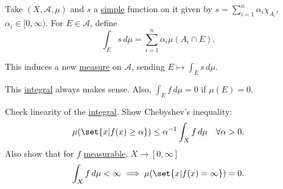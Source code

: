 \documentclass{article}
\begin{document}
\begin{defi}
    Take  $(X, \mathscr{A}, \mu)$ and $s$ a \hyperlink{def:simple}{simple} function on it given by $s=\sum_{i=1}^n \alpha_i \chi_{A_i}$, $\alpha_i \in [0, \infty)$.
    For $E \in \mathscr{A}$, define
    \begin{equation*}
        \int_E s \, d\mu = \sum_{i=1}^n \alpha_i \mu(A_i \cap E).
    \end{equation*}
\end{defi}
\begin{remark}
    This induces a new \hyperlink{def:measure}{measure} on $\mathscr{A}$, sending $E \mapsto \int_E s \, d\mu$.
\end{remark}

\begin{remark}
    This \hyperlink{def:integral}{integral} always makes sense. Also, $\int_E f \, d\mu = 0$ if $\mu(E) = 0$.
\end{remark}
\begin{ex}
    Check linearity of the \hyperlink{def:integral}{integral}. Show \hypertarget{def:chebyshev}{Chebyshev's inequality:}
    \begin{equation*}
        \mu(\set{x | f(x) \geq \alpha}) \leq \alpha^{-1} \int_X f \, d\mu \quad \forall \alpha > 0.
    \end{equation*}
    Also show that for $f$ \hyperlink{def:measFunc}{measurable}, $X \to [0, \infty]$
    \begin{equation*}\int_X f \, d\mu < \infty \implies \mu(\set{x | f(x) = \infty}) = 0.\end{equation*}
\end{ex}
\end{document}
